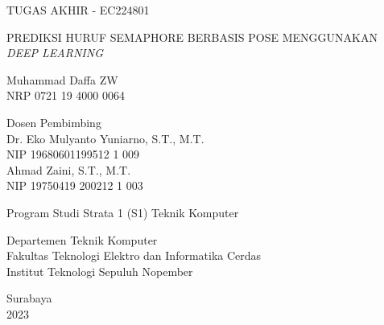 \begin{large}
 TUGAS AKHIR - EC224801
\end{large}

\vspace{\fill}

\begin{spacing}{1.5}
  \begin{Large}
    PREDIKSI HURUF SEMAPHORE BERBASIS POSE MENGGUNAKAN \textit{DEEP LEARNING}%
  \end{Large}
\end{spacing}

\vspace{\fill}

\begin{large}
  Muhammad Daffa ZW  \\
  \textmd{NRP 0721 19 4000 0064}
\end{large}

\vspace{\fill}

\begin{large}
  \textmd{Dosen Pembimbing} \\
   Dr. Eko Mulyanto Yuniarno, S.T., M.T. \\
  \textmd{NIP 19680601199512 1 009} \\
  Ahmad Zaini, S.T., M.T. \\
  \textmd{NIP 19750419  200212 1 003}
\end{large}

\vspace{\fill}

Program Studi Strata 1 (S1) Teknik Komputer \\

\mdseries

Departemen Teknik Komputer \\
Fakultas Teknologi Elektro dan Informatika Cerdas \\
Institut Teknologi Sepuluh Nopember

Surabaya \\
2023
